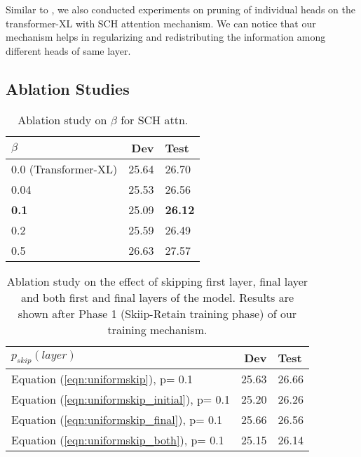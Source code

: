 \documentclass[11pt]{article}
\begin{document}
Similar to \citep{DBLP:conf/nips/MichelLN19}, we also conducted experiments on pruning of individual heads on the transformer-XL with SCH attention mechanism. We can notice that our mechanism helps in regularizing and redistributing the information among different heads of same layer.




\subsection{Ablation Studies}
\label{Ablation_Study}


\begin{table}[!htb]
        

\begin{tabular}{lrl}
\hline \textbf{$\beta$} & \textbf{Dev} & \textbf{Test} \\ 
\hline
0.0 (Transformer-XL) & 25.64 & 26.70 \\
\hline
0.04  & 25.53 & 26.56   \\
\textbf{0.1} & 25.09 & \textbf{26.12} \\
0.2 & 25.59  &  26.49 \\
0.5 & 26.63 & 27.57 \\
\hline
\end{tabular}
\caption{ Ablation study on $\beta$ for SCH attn. } 
\label{abl:betawt103} 
\end{table}




\begin{table}[!htb]
\centering
\begin{tabular}{lrl}
\hline \textbf{$p_{skip}(layer)$} & \textbf{Dev} & \textbf{Test} \\ \hline
Equation (\ref{eqn:uniformskip}), p= 0.1 & 25.63 & 26.66  \\
Equation (\ref{eqn:uniformskip_initial}), p= 0.1 & 25.20 & 26.26  \\
Equation (\ref{eqn:uniformskip_final}), p= 0.1 & 25.66 & 26.56 \\
Equation (\ref{eqn:uniformskip_both}), p= 0.1 & 25.15 & 26.14 \\


\hline
\end{tabular}
\caption{\label{font-table} Ablation study on the effect of skipping first layer, final layer and both first and final layers of the model. Results are shown after Phase 1 (Skiip-Retain training phase) of our training mechanism.}
\label{table:skipwayswt103}

\end{table}
\end{document}
